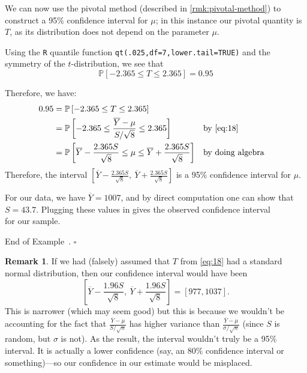 \documentclass[10pt]{article}
\theoremstyle{definition}
\newtheorem{remark}[theorem]{Remark}
\newtheorem{example}[theorem]{Example}
\renewenvironment{example}
{\begin{oldexample}}
  {\par\smallskip\hfill   End of Example~\theexample. $\square$    \par\end{oldexample}}
\newcommand{\1}[1]{\textbf{1}_{\left[#1\right]}} %
\def\P{\mathbb{P}} %
\begin{document}
\begin{example}[Similar to example 8.11 in the textbook]
  We can now use the pivotal method (described in \cref{rmk:pivotal-method})
  to construct a 95\% confidence interval for $\mu$; in this instance our
  pivotal quantity is $T$, as its distribution does not depend on the
  parameter $\mu$.
 
  Using the \texttt{R} quantile function
  \texttt{qt(.025,df=7,lower.tail=TRUE)} and the symmetry of the
  $t$-distribution, we see that
  \begin{equation*}
    \P\left[-2.365 \leq T \leq 2.365\right] = 0.95
  \end{equation*}

  Therefore, we have:
  \begin{align*}
    0.95
    &=\P\left[-2.365 \leq T \leq 2.365\right]\\
    &=\P\left[-2.365 \leq \frac{\overline{Y}-\mu}{S/\sqrt{8}} \leq
      2.365\right] &&\text{by \cref{eq:18}}\\
    &=\P\left[\overline{Y}-\frac{2.365 S}{\sqrt{8}}\leq \mu \leq \overline{Y} + \frac{2.365S}{\sqrt{8}}\right]
      &&\text{by doing algebra}\\
  \end{align*}
  Therefore, the interval $[\overline{Y}-\frac{2.365 S}{\sqrt{8}},\
  \overline{Y} + \frac{2.365S}{\sqrt{8}}]$ is a 95\% confidence interval for
  $\mu$.

  For our data, we have $\overline{Y}=1007$, and by direct computation one can
  show that $S = 43.7$. Plugging these values in gives the observed confidence
  interval
  \begin{equation*}
    [970.5,1043.5]
  \end{equation*}
  for our sample.
\end{example}

\begin{remark}
  If we had (falsely) assumed that $T$ from \cref{eq:18} had a standard normal
  distribution, then our confidence interval would have been
  \begin{equation*}
    \left[\overline{Y}-\frac{1.96 S}{\sqrt{8}},\
    \overline{Y} + \frac{1.96S}{\sqrt{8}}\right] = [977,1037].
  \end{equation*}
  This is narrower (which may seem good) but this is because we wouldn't be
  accounting for the fact that $\frac{\overline{Y}-\mu}{S/\sqrt{n}}$ has
  higher variance than $\frac{\overline{Y}-\mu}{\sigma/\sqrt{n}}$ (since $S$
  is random, but $\sigma$ is not). As the result, the interval wouldn't truly
  be a 95\% interval. It is actually a lower confidence (say, an $80\%$
  confidence interval or something)---so our confidence in our estimate would
  be misplaced.
\end{remark}
\end{document}
